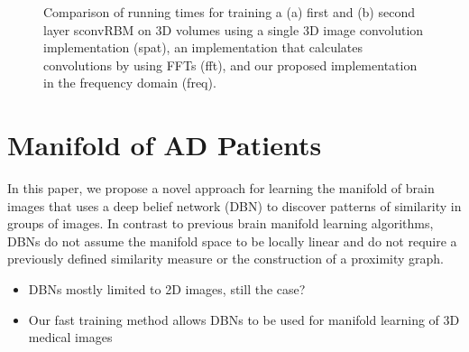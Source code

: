 \begin{figure}[t!]

\caption[Comparison of running times for training a sconvRBMs on 3D
images]{Comparison of running times for training a (a) first and (b) second
layer sconvRBM on 3D volumes using a single 3D image convolution implementation
(spat), an implementation that calculates convolutions by using FFTs (fft), and
our proposed implementation in the frequency domain (freq).}
\label{fig:run_oasis}
\end{figure}

\section{Manifold of AD Patients}


In this paper, we propose a novel approach for learning the manifold of brain
images that uses a deep belief network (DBN) \cite{Hinton2006b} to discover
patterns of similarity in groups of images. In contrast to previous
brain manifold learning algorithms, DBNs do not assume the manifold
space to be locally linear and do not require a previously defined similarity
measure or the construction of a proximity graph.
\begin{itemize}
\item DBNs mostly limited to 2D images, still the case?
\item Our fast training method allows DBNs to be used for manifold learning of
3D medical images
\end{itemize}


